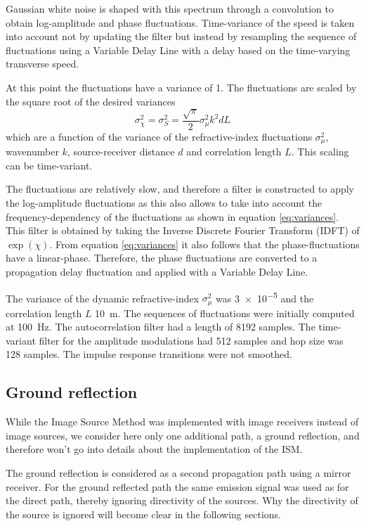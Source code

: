 \documentclass[10pt,twocolumn]{article}
\begin{document}
Gaussian white noise is shaped with this spectrum through a convolution to
obtain log-amplitude and phase fluctuations. Time-variance of the speed is taken
into account not by updating the filter but instead by resampling the sequence of
fluctuations using a Variable Delay Line with a delay based on the time-varying transverse speed.

At this point the fluctuations have a variance of 1. The fluctuations are scaled
by the square root of the desired variances \cite{Daigle1983}
\begin{equation}\label{eq:variances}
 \sigma_{\chi}^2 = \sigma_{S}^2 = \frac{\sqrt{\pi}}{2} \sigma_{\mu}^2 k^2 d L
\end{equation}
which are a function of the variance of the refractive-index fluctuations
$\sigma_{\mu}^2$, wavenumber $k$, source-receiver distance $d$ and correlation
length $L$. This scaling can be time-variant.

The fluctuations are relatively slow, and therefore a filter is constructed to
apply the log-amplitude fluctuations as this also allows to take into account the
frequency-dependency of the fluctuations as shown in equation
\ref{eq:variances}. This filter is obtained by taking the Inverse Discrete
Fourier Transform (IDFT) of $\exp(\chi)$. From equation \ref{eq:variances} it
also follows that the phase-fluctuations have a linear-phase. Therefore, the
phase fluctuations are converted to a propagation delay fluctuation and applied
with a Variable Delay Line.

The variance of the dynamic refractive-index $\sigma_{\mu}^2$ was \SI{3e-5}{}
and the correlation length $L$ \SI{10}{\meter}. The sequences of fluctuations were
initially computed at \SI{100}{\hertz}. The autocorrelation filter had a length
of 8192 samples. The time-variant filter for the amplitude modulations had 512 samples
and hop size was 128 samples. The impulse response transitions were not smoothed.

\subsection{Ground reflection}
While the Image Source Method \cite{Mechel2013} was implemented with image
receivers instead of image sources, we consider here only one additional path,
a ground reflection, and therefore won't go into details about the
implementation of the ISM.

The ground reflection is considered as a second propagation path using a mirror receiver.
For the ground reflected path the same emission signal was used as for the direct path, thereby ignoring directivity of the sources.
Why the directivity of the source is ignored will become clear in the following sections.
\end{document}
